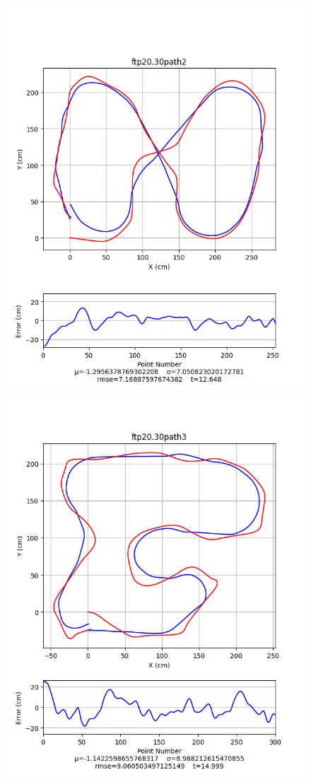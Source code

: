 \documentclass[12pt]{article}
\begin{document}
\begin{flushleft}
\begin{figure}[H]
\includegraphics[width=\linewidth]{images/pathData/ftppath2}
\endminipage\\
\includegraphics[width=\linewidth]{images/pathData/ftppath3}

\end{figure}
\end{flushleft}
\end{document}
